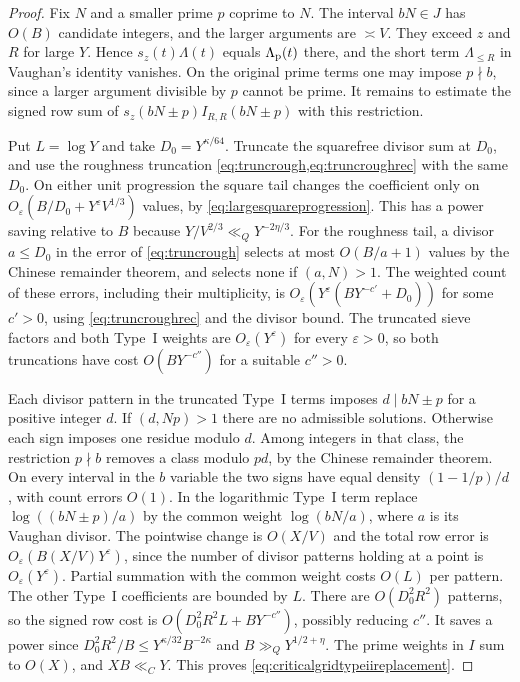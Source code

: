 \documentclass[11pt,a4paper]{article}
\numberwithin{equation}{section}
\begin{document}
\begin{proof}
Fix $N$ and a smaller prime $p$ coprime to $N$.
The interval $bN\in J$ has $O(B)$ candidate integers,
and the larger arguments are $\asymp V$. They exceed
$z$ and $R$ for large $Y$. Hence $s_z(t)\Lambda(t)$
equals $\Lambda_{\rm p}(t)$ there, and the short
term $\Lambda_{\le R}$ in Vaughan's identity vanishes.
On the original prime terms one may impose $p\nmid b$,
since a larger argument divisible by $p$ cannot be prime.
It remains to estimate the signed row sum of
$s_z(bN\pm p) I_{R,R}(bN\pm p)$ with this restriction.

Put $L=\log Y$ and take $D_0=Y^{\kappa/64}$. Truncate
the squarefree divisor sum at $D_0$, and use the
roughness truncation \cref{eq:truncrough,eq:truncroughrec}
with the same $D_0$. On either unit progression
the square tail changes the coefficient only on
$O_\varepsilon(B/D_0+Y^\varepsilon V^{1/3})$ values,
by \cref{eq:largesquareprogression}. This has a power
saving relative to $B$ because
$Y/V^{2/3}\ll_Q Y^{-2\eta/3}$. For the roughness tail,
a divisor $a\le D_0$ in the error of \cref{eq:truncrough}
selects at most $O(B/a+1)$ values by the Chinese
remainder theorem, and selects none if $(a,N)>1$.
The weighted count of these errors, including their
multiplicity, is $O_\varepsilon(Y^\varepsilon
 (B Y^{-c'}+D_0))$ for some $c'>0$, using
\cref{eq:truncroughrec} and the divisor bound.
The truncated sieve factors and both Type~I weights
are $O_\varepsilon(Y^\varepsilon)$ for every
$\varepsilon>0$, so both truncations have cost
$O(BY^{-c''})$ for a suitable $c''>0$.

Each divisor pattern in the truncated Type~I terms
imposes $d\mid bN\pm p$ for a positive integer $d$.
If $(d,Np)>1$ there are no admissible solutions.
Otherwise each sign imposes one residue modulo $d$.
Among integers in that class, the restriction $p\nmid b$
removes a class modulo $p d$, by the Chinese remainder
theorem. On every interval in the $b$ variable the
two signs have equal density $(1-1/p)/d$, with count
errors $O(1)$. In the logarithmic Type~I term replace
$\log((bN\pm p)/a)$ by the common weight $\log(bN/a)$,
where $a$ is its Vaughan divisor. The pointwise change
is $O(X/V)$ and the total row error is
$O_\varepsilon(B(X/V)Y^\varepsilon)$, since the number
of divisor patterns holding at a point is
$O_\varepsilon(Y^\varepsilon)$. Partial summation
with the common weight costs $O(L)$ per pattern.
The other Type~I coefficients are bounded by $L$.
There are $O(D_0^2 R^2)$ patterns, so the signed row
cost is $O(D_0^2 R^2L+BY^{-c''})$, possibly reducing
$c''$. It saves a power since
$D_0^2R^2/B\le Y^{\kappa/32} B^{-2\kappa}$ and
$B\gg_Q Y^{1/2+\eta}$. The prime weights in $I$
sum to $O(X)$, and $XB\ll_C Y$. This proves
\cref{eq:criticalgridtypeiireplacement}.


\end{proof}
\end{document}
